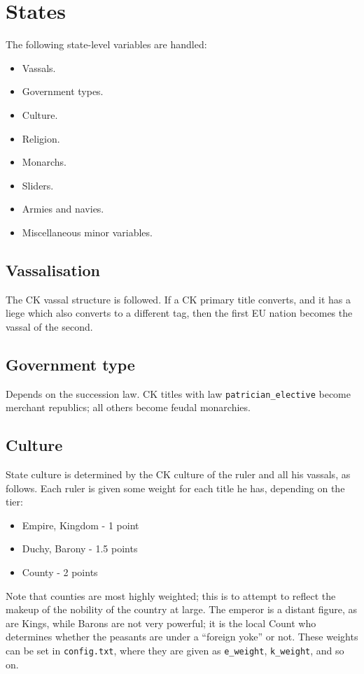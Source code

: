 \documentclass[12pt,ebook,oneside]{book}
\begin{document}
\chapter{States}

The following state-level variables are handled:
\begin{itemize}
\item Vassals.
\item Government types. 
\item Culture. 
\item Religion. 
\item Monarchs. 
\item Sliders.
\item Armies and navies. 
\item Miscellaneous minor variables. 
\end{itemize}

\section{Vassalisation}

The CK vassal structure is followed. If a CK primary title converts,
and it has a liege which also converts to a different tag, then the first EU nation
becomes the vassal of the second. 

\section{Government type}

Depends on the succession law. CK titles with law
\verb|patrician_elective| become merchant republics; all others
become feudal monarchies.

\section{Culture}

State culture is determined by the CK culture of the ruler and all his
vassals, as follows. Each ruler is given some weight for each title he
has, depending on the tier:
\begin{itemize}
\item Empire, Kingdom - 1 point
\item Duchy, Barony - 1.5 points
\item County - 2 points
\end{itemize}
Note that counties are most highly weighted; this is to attempt to
reflect the makeup of the nobility of the country at large. The
emperor is a distant figure, as are Kings, while Barons are not very
powerful; it is the local Count who
determines whether the peasants are under a ``foreign yoke'' or not.
These weights can be set in \verb|config.txt|, where they are given 
as \verb|e_weight|, \verb|k_weight|, and so on. 
\end{document}
